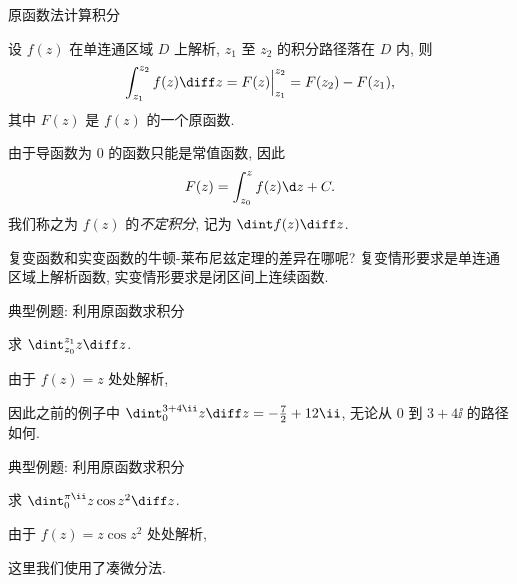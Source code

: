 \begin{frame}{原函数法计算积分}
	\onslide<+->
	\begin{theorem*}
		设 $f(z)$ 在单连通区域 $D$ 上解析, $z_1$ 至 $z_2$ 的积分路径落在 $D$ 内, 则
		\[
			\int_{z_1}^{z_2}f(z)\diff z=F(z)\Big|_{z_1}^{z_2}=F(z_2)-F(z_1),
		\]
		其中 $F(z)$ 是 $f(z)$ 的一个原函数.
	\end{theorem*}
	\onslide<+->
	由于导函数为 $0$ 的函数只能是常值函数, 因此
	\[
		F(z)=\int_{z_0}^zf(z)\d z+C.
	\]
	\onslide<+->
	我们称之为 $f(z)$ 的\emph{不定积分}, 记为 \emph{$\dint f(z)\diff z$}.

	\onslide<+->
	复变函数和实变函数的牛顿-莱布尼兹定理的差异在哪呢?
	\onslide<+->
	复变情形要求是\alert{单连通区域上解析函数}, 实变情形要求是\alert{闭区间上连续函数}.
\end{frame}


\begin{frame}{典型例题: 利用原函数求积分}
	\onslide<+->
	\begin{example}[nearnext]
		求 $\dint_{z_0}^{z_1}z\diff z$.
	\end{example}
	\onslide<+->
	\begin{solution}[nearprev]
		由于 $f(z)=z$ 处处解析,
		\bigdel
	\end{solution}
	\onslide<+->
	因此之前的例子中 $\dint_0^{3+4\ii}z\diff z=-\frac72+12\ii$, 无论从 $0$ 到 $3+4\ii$ 的路径如何.
\end{frame}


\begin{frame}{典型例题: 利用原函数求积分}
	\onslide<+->
	\begin{example}[nearnext]
		求 $\dint_0^{\pi\ii}z\cos z^2\diff z$.
	\end{example}
	\onslide<+->
	\begin{solution}[nearprev]
		由于 $f(z)=z\cos z^2$ 处处解析,
		\bigdel
	\end{solution}
	\onslide<+->
	这里我们使用了\alert{凑微分法}.
\end{frame}


